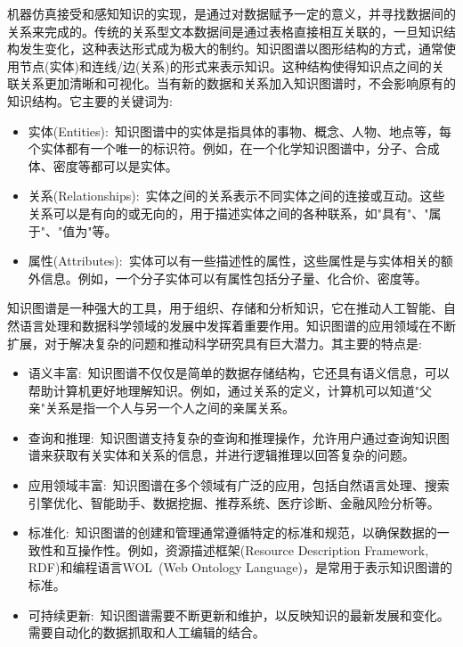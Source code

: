 机器仿真接受和感知知识的实现，是通过对数据赋予一定的意义，并寻找数据间的关系来完成的。传统的关系型文本数据间是通过表格直接相互关联的，一旦知识结构发生变化，这种表达形式成为极大的制约。知识图谱以图形结构的方式，通常使用节点(实体)和连线/边(关系)的形式来表示知识。这种结构使得知识点之间的关联关系更加清晰和可视化。当有新的数据和关系加入知识图谱时，不会影响原有的知识结构。它主要的关键词为:
\begin{itemize}
	\item 实体\textrm{(Entities)}:~知识图谱中的实体是指具体的事物、概念、人物、地点等，每个实体都有一个唯一的标识符。例如，在一个化学知识图谱中，分子、合成体、密度等都可以是实体。
	\item 关系\textrm{(Relationships)}:~实体之间的关系表示不同实体之间的连接或互动。这些关系可以是有向的或无向的，用于描述实体之间的各种联系，如"具有"、"属于"、"值为"等。
	\item 属性\textrm{(Attributes)}:~实体可以有一些描述性的属性，这些属性是与实体相关的额外信息。例如，一个分子实体可以有属性包括分子量、化合价、密度等。
\end{itemize}

知识图谱是一种强大的工具，用于组织、存储和分析知识，它在推动人工智能、自然语言处理和数据科学领域的发展中发挥着重要作用。知识图谱的应用领域在不断扩展，对于解决复杂的问题和推动科学研究具有巨大潜力。其主要的特点是:
\begin{itemize}
	\item 语义丰富:~知识图谱不仅仅是简单的数据存储结构，它还具有语义信息，可以帮助计算机更好地理解知识。例如，通过关系的定义，计算机可以知道"父亲"关系是指一个人与另一个人之间的亲属关系。
	\item 查询和推理:~知识图谱支持复杂的查询和推理操作，允许用户通过查询知识图谱来获取有关实体和关系的信息，并进行逻辑推理以回答复杂的问题。
	\item 应用领域丰富:~知识图谱在多个领域有广泛的应用，包括自然语言处理、搜索引擎优化、智能助手、数据挖掘、推荐系统、医疗诊断、金融风险分析等。
	\item 标准化:~知识图谱的创建和管理通常遵循特定的标准和规范，以确保数据的一致性和互操作性。例如，资源描述框架\textrm{(Resource Description Framework, RDF)}和编程语言\textrm{WOL~(Web Ontology Language)}，是常用于表示知识图谱的标准。
	\item 可持续更新:~知识图谱需要不断更新和维护，以反映知识的最新发展和变化。需要自动化的数据抓取和人工编辑的结合。
\end{itemize}


